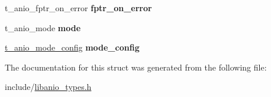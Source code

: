 \begin{DoxyCompactItemize}
\item 
\hypertarget{structs__anio_a0dca098f55a1fea8ca8f12ff6442fef3}{}t\+\_\+anio\+\_\+fptr\+\_\+on\+\_\+error {\bfseries fptr\+\_\+on\+\_\+error}\label{structs__anio_a0dca098f55a1fea8ca8f12ff6442fef3}

\item 
\hypertarget{structs__anio_a3a5ac796814dbe122539f2c83c2ee148}{}t\+\_\+anio\+\_\+mode {\bfseries mode}\label{structs__anio_a3a5ac796814dbe122539f2c83c2ee148}

\item 
\hypertarget{structs__anio_a36028b85a43b5e85ccbe98d66e104b63}{}\hyperlink{unionu__anio__mode__config}{t\+\_\+anio\+\_\+mode\+\_\+config} {\bfseries mode\+\_\+config}\label{structs__anio_a36028b85a43b5e85ccbe98d66e104b63}

\end{DoxyCompactItemize}


The documentation for this struct was generated from the following file\+:\begin{DoxyCompactItemize}
\item 
include/\hyperlink{libanio__types_8h}{libanio\+\_\+types.\+h}\end{DoxyCompactItemize}
